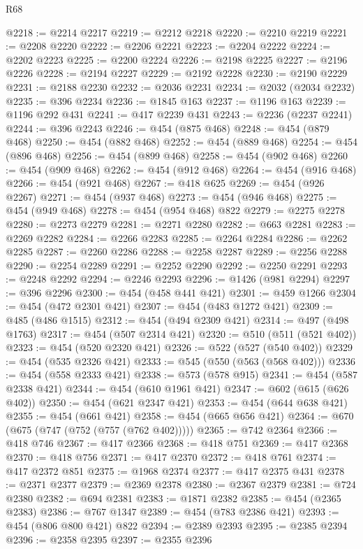 \begin{lexlean}{R68}
\begin{coremodule}
@2218 := @2214 @2217
@2219 := @2212 @2218
@2220 := @2210 @2219
@2221 := @2208 @2220
@2222 := @2206 @2221
@2223 := @2204 @2222
@2224 := @2202 @2223
@2225 := @2200 @2224
@2226 := @2198 @2225
@2227 := @2196 @2226
@2228 := @2194 @2227
@2229 := @2192 @2228
@2230 := @2190 @2229
@2231 := @2188 @2230
@2232 := @2036 @2231
@2234 := @2032 (@2034 @2232)
@2235 := @396 @2234
@2236 := @1845 @163
@2237 := @1196 @163
@2239 := @1196 @292 @431
@2241 := @417 @2239 @431
@2243 := @2236 (@2237 @2241)
@2244 := @396 @2243
@2246 := @454 (@875 @468)
@2248 := @454 (@879 @468)
@2250 := @454 (@882 @468)
@2252 := @454 (@889 @468)
@2254 := @454 (@896 @468)
@2256 := @454 (@899 @468)
@2258 := @454 (@902 @468)
@2260 := @454 (@909 @468)
@2262 := @454 (@912 @468)
@2264 := @454 (@916 @468)
@2266 := @454 (@921 @468)
@2267 := @418 @625
@2269 := @454 (@926 @2267)
@2271 := @454 (@937 @468)
@2273 := @454 (@946 @468)
@2275 := @454 (@949 @468)
@2278 := @454 (@954 @468) @822
@2279 := @2275 @2278
@2280 := @2273 @2279
@2281 := @2271 @2280
@2282 := @663 @2281
@2283 := @2269 @2282
@2284 := @2266 @2283
@2285 := @2264 @2284
@2286 := @2262 @2285
@2287 := @2260 @2286
@2288 := @2258 @2287
@2289 := @2256 @2288
@2290 := @2254 @2289
@2291 := @2252 @2290
@2292 := @2250 @2291
@2293 := @2248 @2292
@2294 := @2246 @2293
@2296 := @1426 (@981 @2294)
@2297 := @396 @2296
@2300 := @454 (@458 @441 @421)
@2301 := @459 @1266
@2304 := @454 (@472 @2301 @421)
@2307 := @454 (@483 @1272 @421)
@2309 := @485 (@486 @1515)
@2312 := @454 (@494 @2309 @421)
@2314 := @497 (@498 @1763)
@2317 := @454 (@507 @2314 @421)
@2320 := @510 (@511 (@521 @402))
@2323 := @454 (@520 @2320 @421)
@2326 := @522 (@527 (@540 @402))
@2329 := @454 (@535 @2326 @421)
@2333 := @545 (@550 (@563 (@568 @402)))
@2336 := @454 (@558 @2333 @421)
@2338 := @573 (@578 @915)
@2341 := @454 (@587 @2338 @421)
@2344 := @454 (@610 @1961 @421)
@2347 := @602 (@615 (@626 @402))
@2350 := @454 (@621 @2347 @421)
@2353 := @454 (@644 @638 @421)
@2355 := @454 (@661 @421)
@2358 := @454 (@665 @656 @421)
@2364 := @670 (@675 (@747 (@752 (@757 (@762 @402)))))
@2365 := @742 @2364
@2366 := @418 @746
@2367 := @417 @2366
@2368 := @418 @751
@2369 := @417 @2368
@2370 := @418 @756
@2371 := @417 @2370
@2372 := @418 @761
@2374 := @417 @2372 @851
@2375 := @1968 @2374
@2377 := @417 @2375 @431
@2378 := @2371 @2377
@2379 := @2369 @2378
@2380 := @2367 @2379
@2381 := @724 @2380
@2382 := @694 @2381
@2383 := @1871 @2382
@2385 := @454 (@2365 @2383)
@2386 := @767 @1347
@2389 := @454 (@783 @2386 @421)
@2393 := @454 (@806 @800 @421) @822
@2394 := @2389 @2393
@2395 := @2385 @2394
@2396 := @2358 @2395
@2397 := @2355 @2396

\end{coremodule}
\end{lexlean}
